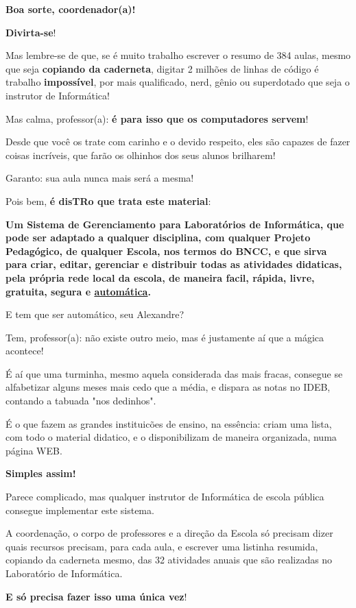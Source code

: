 \begin{multicols}{2}
\textbf{Boa sorte, coordenador(a)!}

\textbf{Divirta-se}!

Mas lembre-se de que, se é muito trabalho escrever o resumo de 384 aulas, mesmo que seja \textbf{copiando da caderneta}, digitar 2 milhões de linhas de código é trabalho \textbf{impossível}, por mais qualificado, nerd, gênio ou superdotado que seja o instrutor de Informática!

Mas calma, professor(a): \textbf{é para isso que os computadores servem}!
 
Desde que você os trate com carinho e o devido respeito, eles são capazes de fazer coisas incríveis, que farão os olhinhos dos seus alunos brilharem!
 
 Garanto: sua aula nunca mais será a mesma!

Pois bem, \textbf{é disTRo que trata este material}:

\textbf{Um Sistema de Gerenciamento para Laboratórios de Informática, que pode ser adaptado a qualquer disciplina, com qualquer Projeto Pedagógico, de qualquer Escola, nos termos do BNCC, e que sirva para criar, editar, gerenciar e distribuir todas as atividades didaticas, pela própria rede local da escola, de maneira facil, rápida, livre, gratuita, segura e \underline{automática}.
}

E tem que ser automático, seu Alexandre?

Tem, professor(a): não existe outro meio, mas é justamente aí que a mágica acontece!

É aí que uma turminha, mesmo aquela considerada das mais fracas, consegue se alfabetizar alguns meses mais cedo que a média, e dispara as notas no IDEB, contando a tabuada "nos dedinhos".

É o que fazem as grandes instituicões de ensino, na essência: criam uma lista, com todo o material didatico, e o disponibilizam de maneira organizada, numa página WEB.

\textbf{Simples assim!}

Parece complicado, mas qualquer instrutor de Informática de escola pública consegue implementar este sistema. 

A coordenação, o corpo de professores e a direção da Escola só precisam dizer quais recursos precisam, para cada aula, e escrever uma listinha resumida, copiando da caderneta mesmo, das 32 atividades anuais que são realizadas no Laboratório de Informática.

\textbf{E só precisa fazer isso uma única vez}!


\end{multicols}
